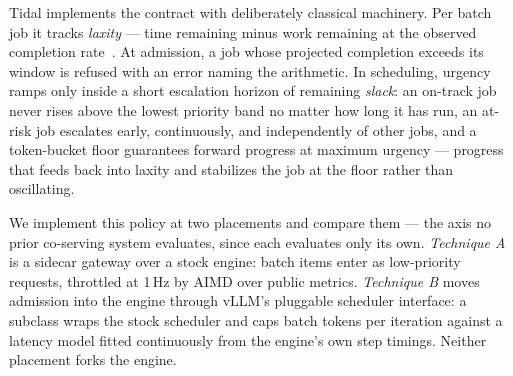 \documentclass[conference]{IEEEtran}
\begin{document}
Tidal implements the contract with deliberately classical machinery. Per batch job it
tracks \emph{laxity} --- time remaining minus work remaining at the observed completion
rate~\citep{llf}. At admission, a job whose projected completion exceeds its window is
refused with an error naming the arithmetic. In scheduling, urgency ramps only inside a
short escalation horizon of remaining \emph{slack}: an on-track job never rises above the
lowest priority band no matter how long it has run, an at-risk job escalates early,
continuously, and independently of other jobs, and a token-bucket floor guarantees
forward progress at maximum urgency --- progress that feeds back into laxity and
stabilizes the job at the floor rather than oscillating.

We implement this policy at two placements and compare them --- the axis no prior
co-serving system evaluates, since each evaluates only its own. \emph{Technique A} is a
sidecar gateway over a stock engine: batch items enter as low-priority requests,
throttled at 1\,Hz by AIMD over public metrics. \emph{Technique B} moves admission into
the engine through vLLM's pluggable scheduler interface: a subclass wraps the stock
scheduler and caps batch tokens per iteration against a latency model fitted continuously
from the engine's own step timings. Neither placement forks the engine.
\end{document}
